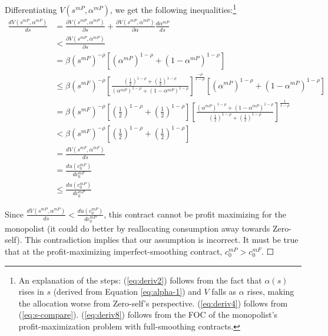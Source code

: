 \documentclass[11pt,english]{article}
\theoremstyle{plain}
\theoremstyle{definition}
\begin{document}
\begin{enumerate} [label=\alph*)]
Differentiating $V\left(s^{mP},\alpha^{mP}\right)$, we get the following
inequalities:\footnote{An explanation of the steps: (\ref{eq:deriv2}) follows from the
fact that $\alpha\left(s\right)$ rises in $s$ (derived from Equation
\ref{eq:alpha-1}) and $V$ falls as $\alpha$ rises, making the allocation
worse from Zero-self's perspective. (\ref{eq:deriv4}) follows
from (\ref{eq:s-compare}). (\ref{eq:deriv8}) follows
from the FOC of the monopolist's profit-maximization problem with
full-smoothing contracts. } 
\begin{align}
\frac{dV\left(s^{mP},\alpha^{mP}\right)}{ds} & =\frac{\partial V\left(s^{mP},\alpha^{mP}\right)}{\partial s}+\frac{\partial V\left(s^{mP},\alpha^{mP}\right)}{\partial\alpha}\frac{d\alpha^{mP}}{ds}\label{eq:deriv1}\\
 & <\frac{\partial V\left(s^{mP},\alpha^{mP}\right)}{\partial s}\label{eq:deriv2}\\
 & =\beta\left(s^{mP}\right)^{-\rho}\left[\left(\alpha^{mP}\right)^{1-\rho}+\left(1-\alpha^{mP}\right)^{1-\rho}\right]\label{eq:deriv3}\\
 & \leq\beta\left(s^{mF}\right)^{-\rho}\left[\frac{\left(\frac{1}{2}\right)^{1-\rho}+\left(\frac{1}{2}\right)^{1-\rho}}{\left(\alpha^{mP}\right)^{1-\rho}+\left(1-\alpha^{mP}\right)^{1-\rho}}\right]^{\frac{-\rho}{1-\rho}}\left[\left(\alpha^{mP}\right)^{1-\rho}+\left(1-\alpha^{mP}\right)^{1-\rho}\right]\label{eq:deriv4}\\
 & =\beta\left(s^{mF}\right)^{-\rho}\left[\left(\frac{1}{2}\right)^{1-\rho}+\left(\frac{1}{2}\right)^{1-\rho}\right]\left[\frac{\left(\alpha^{mP}\right)^{1-\rho}+\left(1-\alpha^{mP}\right)^{1-\rho}}{\left(\frac{1}{2}\right)^{1-\rho}+\left(\frac{1}{2}\right)^{1-\rho}}\right]^{\frac{1}{1-\rho}}\label{eq:deriv5}\\
 & <\beta\left(s^{mF}\right)^{-\rho}\left[\left(\frac{1}{2}\right)^{1-\rho}+\left(\frac{1}{2}\right)^{1-\rho}\right]\label{eq:deriv6}\\
 & =\frac{dV\left(s^{mF},\alpha^{mF}\right)}{ds}\label{eq:deriv7}\\
 & =\frac{du\left(c_{0}^{mF}\right)}{dc_{0}^{mF}}\label{eq:deriv8}\\
 & \leq\frac{du\left(c_{0}^{mP}\right)}{dc_{0}^{mP}}\label{eq:deriv9} 
\end{align}

Since $\frac{dV\left(s^{mP},\alpha^{mP}\right)}{ds}<\frac{du\left(c_{0}^{mP}\right)}{dc_{0}^{mP}}$,
this contract cannot be profit maximizing for the monopolist (it could
do better by reallocating consumption away towards Zero-self). This
contradiction implies that our assumption is incorrect. It must be
true that at the profit-maximizing imperfect-smoothing contract, $c_{0}^{mP}>c_{0}^{mF}$.
$\Square$
\end{enumerate}
\end{document}
